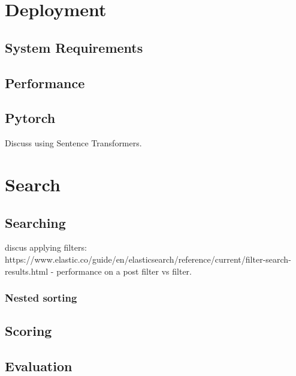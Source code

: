 \documentclass[letterpaper, 10 pt, conference]{ieeeconf}  %
\begin{document}
\section{Deployment}

\subsection{System Requirements}

\subsection{Performance}


\subsection{Pytorch} 
Discuss using Sentence Transformers. 


\section{Search}
\subsection{Searching}
discus applying filters: https://www.elastic.co/guide/en/elasticsearch/reference/current/filter-search-results.html
  - performance on a post filter vs filter.
\subsubsection{Nested sorting}
\subsection{Scoring}

\subsection{Evaluation}


\end{document}
